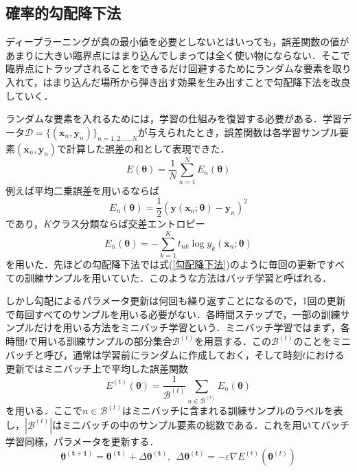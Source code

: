 \documentclass[a4paper,11pt]{jsreport}
\begin{document}
\subsection{確率的勾配降下法}
ディープラーニングが真の最小値を必要としないとはいっても，誤差関数の値があまりに大きい臨界点にはまり込んでしまっては全く使い物にならない．そこで臨界点にトラップされることをできるだけ回避するためにランダムな要素を取り入れて，はまり込んだ場所から弾き出す効果を生み出すことで勾配降下法を改良していく．\par
ランダムな要素を入れるためには，学習の仕組みを復習する必要がある．学習データ$\mathcal{D}=\{(\bm{x}_n,\bm{y}_n)\}_{n=1,2,\dots,N}$が与えられたとき，誤差関数は各学習サンプル要素$(\bm{x}_n,\bm{y}_n)$で計算した誤差の和として表現できた．
\begin{equation}
  E(\bm{\theta}) = \frac{1}{N}\sum_{n=1}^{N}E_n(\bm{\bm{\theta}}) \label{勾配降下法}
\end{equation}
例えば平均二乗誤差を用いるならば
\begin{equation}
  E_n(\bm{\bm{\theta}}) = \frac{1}{2}\left( \bm{y}(\bm{x}_n ; \bm{\theta}) - \bm{y}_n \right)^2
\end{equation}
であり，$K$クラス分類ならば交差エントロピー
\begin{equation}
  E_n(\bm{\bm{\theta}}) = - \sum_{k=1}^{K} t_{nk}\log{y_k(\bm{x}_n ; \bm{\theta})}
\end{equation}
を用いた．先ほどの勾配降下法では式(\ref{勾配降下法})のように毎回の更新ですべての訓練サンプルを用いていた．このような方法はバッチ学習と呼ばれる．\par
しかし勾配によるパラメータ更新は何回も繰り返すことになるので，1回の更新で毎回すべてのサンプルを用いる必要がない．各時間ステップで，一部の訓練サンプルだけを用いる方法をミニバッチ学習という．ミニバッチ学習ではまず，各時間$t$で用いる訓練サンプルの部分集合$\mathcal{B}^{(t)}$を用意する．この$\mathcal{B}^{(t)}$のことをミニバッチと呼び，通常は学習前にランダムに作成しておく，そして時刻$t$における更新ではミニバッチ上で平均した誤差関数
\begin{equation}
  E^{(t)}(\bm{\theta}) = \frac{1}{\mathcal{B}^{(t)}} \sum_{n\in \mathcal{B}^{(t)}} E_n(\bm{\theta})
\end{equation}
を用いる．ここで$n\in \mathcal{B}^{(t)}$はミニバッチに含まれる訓練サンプルのラベルを表し，$|\mathcal{B}^{(t)}|$はミニバッチの中のサンプル要素の総数である．これを用いてバッチ学習同様，パラメータを更新する．
\begin{equation}
  \bm{\theta^{(t+1)}} = \bm{\theta^{(t)}} + \Delta \bm{\theta^{(t)}} , \ \  \Delta \bm{\theta^{(t)}} = - \varepsilon \nabla E^{(t)}\left( \bm{\theta}^{(t)} \right)
\end{equation}
\end{document}
